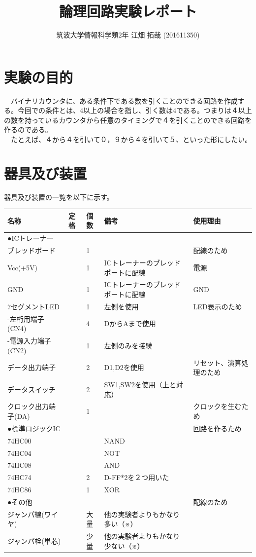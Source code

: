 \documentclass{scrartcl}
\author{筑波大学情報科学類2年 江畑 拓哉 (201611350)}
\date{}
\title{論理回路実験レポート}
\begin{document}
\maketitle


\section{実験の目的}
\label{sec:org2aaa4be}
　バイナリカウンタに、ある条件下である数を引くことのできる回路を作成する。今回での条件とは、4以上の場合を指し、引く数は4である。つまりは４以上の数を持っているカウンタから任意のタイミングで４を引くことのできる回路を作るのである。\\
　たとえば、４から４を引いて０，９から４を引いて５、といった形にしたい。\\

\section{器具及び装置}
\label{sec:org82be53b}
器具及び装置の一覧を以下に示す。\\
\begin{center}
\begin{tabular}{|l|l|l|l|l|}
\hline
名称 & 定格 & 個数 & 備考 & 使用理由\\
\hline
●ICトレーナー &  &  &  & \\
ブレッドボード &  & 1 &  & 配線のため\\
Vcc(+5V) &  & 1 & ICトレーナーのブレッドポートに配線 & 電源\\
GND &  & 1 & ICトレーナーのブレッドポートに配線 & GND\\
7セグメントLED &  & 1 & 左側を使用 & LED表示のため\\
-左桁用端子(CN4) &  & 4 & DからAまで使用 & \\
-電源入力端子(CN2) &  & 1 & 左側のみを接続 & \\
データ出力端子 &  & 2 & D1,D2を使用 & リセット、演算処理のため\\
データスイッチ &  & 2 & SW1,SW2を使用（上と対応） & \\
クロック出力端子(DA) &  & 1 &  & クロックを生むため\\
\hline
●標準ロジックIC &  &  &  & 回路を作るため\\
74HC00 &  &  & NAND & \\
74HC04 &  &  & NOT & \\
74HC08 &  &  & AND & \\
74HC74 &  & 2 & D-FF*2を２つ用いた & \\
74HC86 &  & 1 & XOR & \\
\hline
●その他 &  &  &  & 配線のため\\
ジャンパ線(ワイヤ) &  & 大量 & 他の実験者よりもかなり多い（※） & \\
ジャンパ栓(単芯) &  & 少量 & 他の実験者よりもかなり少ない（※） & \\
\hline
\end{tabular}
\end{center}
\end{document}
